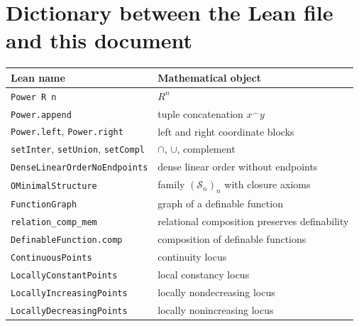 \documentclass[11pt]{article}
\begin{document}
\section{Dictionary between the Lean file and this document}

\begin{center}
\begin{tabular}{ll}
\hline
Lean name & Mathematical object \\
\hline
\texttt{Power R n} & $R^n$ \\
\texttt{Power.append} & tuple concatenation $x\mathbin{{}^\frown}y$ \\
\texttt{Power.left}, \texttt{Power.right} & left and right coordinate blocks \\
\texttt{setInter}, \texttt{setUnion}, \texttt{setCompl} & $\cap$, $\cup$, complement \\
\texttt{DenseLinearOrderNoEndpoints} & dense linear order without endpoints \\
\texttt{OMinimalStructure} & family $(\mathcal S_n)_n$ with closure axioms \\
\texttt{FunctionGraph} & graph of a definable function \\
\texttt{relation\_comp\_mem} & relational composition preserves definability \\
\texttt{DefinableFunction.comp} & composition of definable functions \\
\texttt{ContinuousPoints} & continuity locus \\
\texttt{LocallyConstantPoints} & local constancy locus \\
\texttt{LocallyIncreasingPoints} & locally nondecreasing locus \\
\texttt{LocallyDecreasingPoints} & locally nonincreasing locus \\
\hline
\end{tabular}
\end{center}
\end{document}
